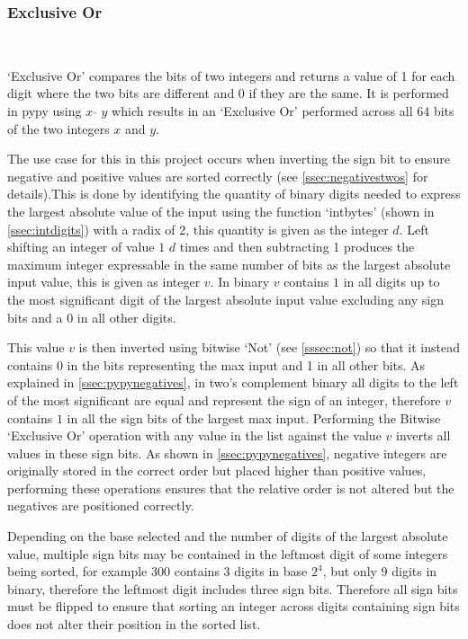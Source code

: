 \documentclass[12pt]{article}
\begin{document}
\subsubsection{Exclusive Or}\
\label{sssec:xor}
\par
`Exclusive Or' compares the bits of two integers and returns a value of 1 for each digit where the two bits are different and 0 if they are the same. It is performed in pypy using $x$ $\hat{}$ $y$ which results in an `Exclusive Or' performed across all 64 bits of the two integers $x$ and $y$. 
\par
The use case for this in this project occurs when inverting the sign bit to ensure negative and positive values are sorted correctly (see \ref{ssec:negativestwos} for details).This is done by identifying the quantity of binary digits needed to express the largest absolute value of the input using the function `int\textunderscore bytes' (shown in \ref{ssec:intdigits}) with a radix of 2, this quantity is given as the integer $d$. Left shifting an integer of value $1$ $d$ times and then subtracting 1 produces the maximum integer expressable in the same number of bits as the largest absolute input value, this is given as integer $v$. In binary $v$ contains $1$ in all digits up to the most significant digit of the largest absolute input value excluding any sign bits and a 0 in all other digits.
\par
This value $v$ is then inverted using bitwise `Not' (see \ref{sssec:not}) so that it instead contains $0$ in the bits representing the max input and 1 in all other bits. As explained in \ref{ssec:pypynegatives}, in two's complement binary all digits to the left of the most significant are equal and represent the sign of an integer, therefore $v$ contains $1$ in all the sign bits of the largest max input. Performing the Bitwise `Exclusive Or' operation with any value in the list against the value $v$ inverts all values in these sign bits. As shown in \ref{ssec:pypynegatives}, negative integers are originally stored in the correct order but placed higher than positive values, performing these operations ensures that the relative order is not altered but the negatives are positioned correctly.
\par
Depending on the base selected and the number of digits of the largest absolute value, multiple sign bits may be contained in the leftmost digit of some integers being sorted, for example $300$ contains 3 digits in base $2^4$, but only 9 digits in binary, therefore the leftmost digit includes three sign bits. Therefore all sign bits must be flipped to ensure that sorting an integer across digits containing sign bits does not alter their position in the sorted list.
\end{document}
